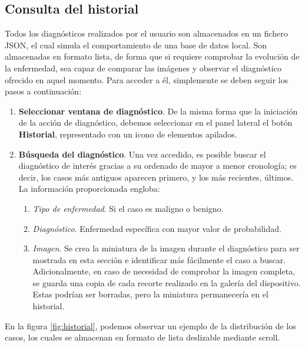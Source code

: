  
 \subsection{Consulta del historial}
 \label{sec:hist}
 
 Todos los diagnósticos realizados por el usuario son almacenados en un fichero JSON, el cual simula el comportamiento de una base de datos local. Son almacenadas en formato lista, de forma que si requiere comprobar la evolución de la enfermedad, sea capaz de comparar las imágenes y observar el diagnóstico ofrecido en aquel momento.  Para acceder a él, simplemente se deben seguir los pasos a continuación:
 
 \begin{enumerate}
 	\item \textbf{Seleccionar ventana de diagnóstico}. De la misma forma que la iniciación de la acción de diagnóstico, debemos seleccionar en el panel lateral el botón \textbf{Historial}, representado con un icono de elementos apilados.
 	\item \textbf{Búsqueda del diagnóstico}. Una vez accedido, es posible buscar el diagnóstico de interés gracias a su ordenado de mayor a menor cronología; es decir, los casos más antiguos aparecen primero, y los más recientes, últimos. La información proporcionada engloba:
 	\begin{enumerate}
 		\item \textit{Tipo de enfermedad}. Si el caso es maligno o benigno.
 		\item \textit{Diagnóstico}. Enfermedad específica con mayor valor de probabilidad.
 		\item \textit{Imagen}. Se crea la miniatura de la imagen durante el diagnóstico para ser mostrada en esta sección e identificar más fácilmente el caso a buscar. Adicionalmente, en caso de necesidad de comprobar la imagen completa, se guarda una copia de cada recorte realizado en la galería del dispositivo. Estas podrían ser borradas, pero la miniatura permanecería en el historial.
 	\end{enumerate}
 \end{enumerate}
 
 En la figura \ref{fig:historial}, podemos observar un ejemplo de la distribución de los casos, los cuales se almacenan en formato de lista deslizable mediante scroll.
 
